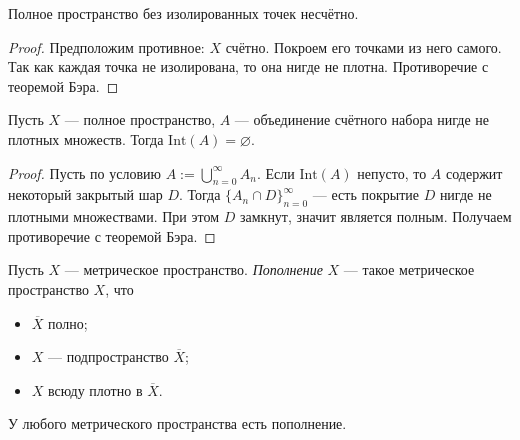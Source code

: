 \documentclass[12pt,a4paper]{article}
\newcommand{\Int}{\ensuremath{\mathrm{Int}}\xspace}
\begin{document}
    \begin{corollary}
        Полное пространство без изолированных точек несчётно.
    \end{corollary}

    \begin{proof}
        Предположим противное: $X$ счётно. Покроем его точками из него самого. Так как каждая точка не изолирована, то она нигде не плотна. Противоречие с теоремой Бэра.
    \end{proof}

    \begin{corollary}
        Пусть $X$ --- полное пространство, $A$ --- объединение счётного набора нигде не плотных множеств. Тогда $\Int(A) = \varnothing$.
    \end{corollary}

    \begin{proof}
        Пусть по условию $A := \bigcup_{n=0}^\infty A_n$. Если $\Int(A)$ непусто, то $A$ содержит некоторый закрытый шар $D$. Тогда $\{A_n \cap D\}_{n=0}^\infty$ --- есть покрытие $D$ нигде не плотными множествами. При этом $D$ замкнут, значит является полным. Получаем противоречие с теоремой Бэра.
    \end{proof}

    \begin{definition}
        Пусть $X$ --- метрическое пространство. \emph{Пополнение} $X$ --- такое метрическое пространство $X$, что
        \begin{multicols}{3}
            \begin{itemize}
                \item $\overline{X}$ полно;
                \item $X$ --- подпространство $\overline{X}$;
                \item $X$ всюду плотно в $\overline{X}$.
            \end{itemize}
        \end{multicols}
    \end{definition}

    \begin{theorem}
        У любого метрического пространства есть пополнение.
    \end{theorem}
\end{document}
